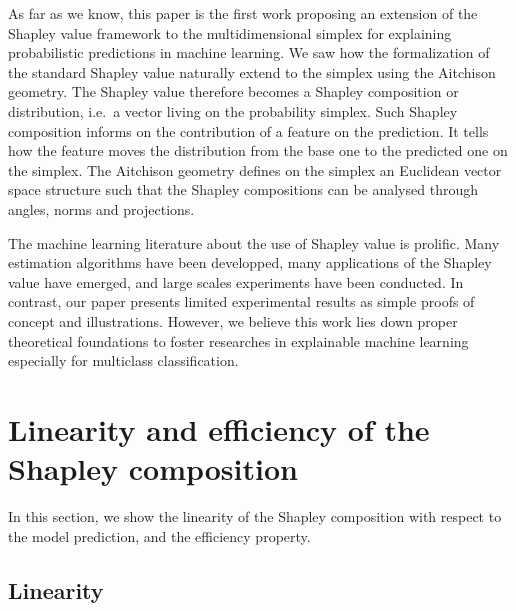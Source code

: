 \documentclass{article}
\theoremstyle{plain}
\theoremstyle{definition}
\theoremstyle{remark}
\begin{document}
As far as we know, this paper is the first work proposing an extension of the Shapley value framework to the multidimensional simplex for explaining probabilistic predictions in machine learning. We saw how the formalization of the standard Shapley value naturally extend to the simplex using the Aitchison geometry. The Shapley value therefore becomes a Shapley composition or distribution, i.e.~a vector living on the probability simplex. Such Shapley composition informs on the contribution of a feature on the prediction. It tells how the feature moves the distribution from the base one to the predicted one on the simplex. The Aitchison geometry defines on the simplex an Euclidean vector space structure such that the Shapley compositions can be analysed through angles, norms and projections.

The machine learning literature about the use of Shapley value is prolific. Many estimation algorithms have been developped, many applications of the Shapley value have emerged, and large scales experiments have been conducted. In contrast, our paper presents limited experimental results as simple proofs of concept and illustrations. However, we believe this work lies down proper theoretical foundations to foster researches in explainable machine learning especially for multiclass classification.

\nocite{langley00}





\newpage
\appendix
\onecolumn

\section{Linearity and efficiency of the Shapley composition}
\label{app:properties}
In this section, we show the linearity of the Shapley composition with respect to the model prediction, and the efficiency property.

\subsection{Linearity}
\end{document}
